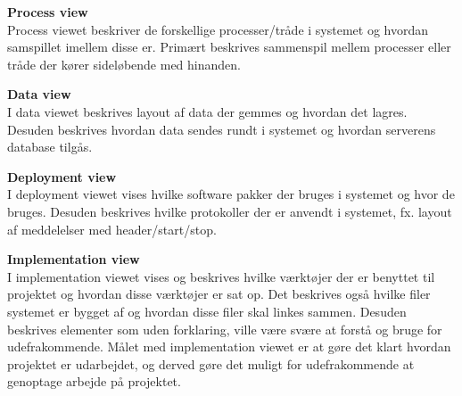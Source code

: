 \textbf{Process view}\\
Process viewet beskriver de forskellige processer/tråde i systemet og hvordan samspillet imellem disse er. Primært beskrives sammenspil mellem processer eller tråde der kører sideløbende med hinanden.

\textbf{Data view}\\
I data viewet beskrives layout af data der gemmes og hvordan det lagres. Desuden beskrives hvordan data sendes rundt i systemet og hvordan serverens database tilgås. 

\textbf{Deployment view}\\
I deployment viewet vises hvilke software pakker der bruges i systemet og hvor de bruges. Desuden beskrives hvilke protokoller der er anvendt i systemet, fx. layout af meddelelser med header/start/stop. 
  

\textbf{Implementation view}\\
I implementation viewet vises og beskrives hvilke værktøjer der er benyttet til projektet og hvordan disse værktøjer er sat op. Det beskrives også hvilke filer systemet er bygget af og hvordan disse filer skal linkes sammen. 
Desuden beskrives elementer som uden forklaring, ville være svære at forstå og bruge for udefrakommende. Målet med implementation viewet er at gøre det klart hvordan projektet er udarbejdet, og derved gøre det muligt for udefrakommende at genoptage arbejde på projektet.


